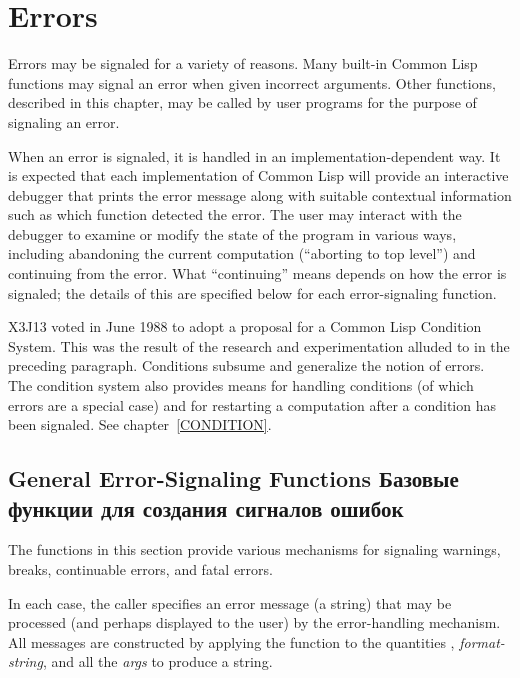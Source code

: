 
\clearpage\def\pagestatus{FINAL PROOF}

\chapter{Errors}
\label{XERROR}

Errors may be signaled for a variety of reasons.
Many built-in Common Lisp functions may signal an error when given incorrect
arguments.  Other functions, described in this chapter,
may be called by user programs for the purpose of signaling
an error.

When an error is signaled, it is
handled in an implementation-dependent way.  It is expected
that each implementation of Common Lisp will provide an interactive debugger that
prints the error message along with suitable contextual information
such as which function detected the error.  The user may interact with
the debugger to examine or modify the state of the program in various
ways, including abandoning the current computation (``aborting to top
level'') and continuing from the error.  What ``continuing'' means
depends on how the error is signaled; the details of this are specified below
for each error-signaling function.

\begin{newer}
X3J13 voted in June 1988
to adopt a proposal for a Common Lisp Condition System.
This was the result of the research and experimentation
alluded to in the preceding paragraph.
Conditions subsume and generalize the notion of errors.
The condition system also provides means for handling
conditions (of which errors are a special case) and
for restarting a computation after a condition has been signaled.
See chapter~\ref{CONDITION}.
\end{newer}

\section{General Error-Signaling Functions Базовые функции для создания сигналов
ошибок}
\label{ERROR-SIGNALLING-FUNCTIONS}

The functions in this section provide various mechanisms
for signaling warnings, breaks, continuable errors, and fatal errors.

In each case, the caller specifies an error message (a string) that may be
processed (and perhaps displayed to the user) by the error-handling
mechanism.  All messages are
constructed by applying the function
 to the quantities {\nil}, \emph{format-string},
and all the \emph{args} to produce a string.


